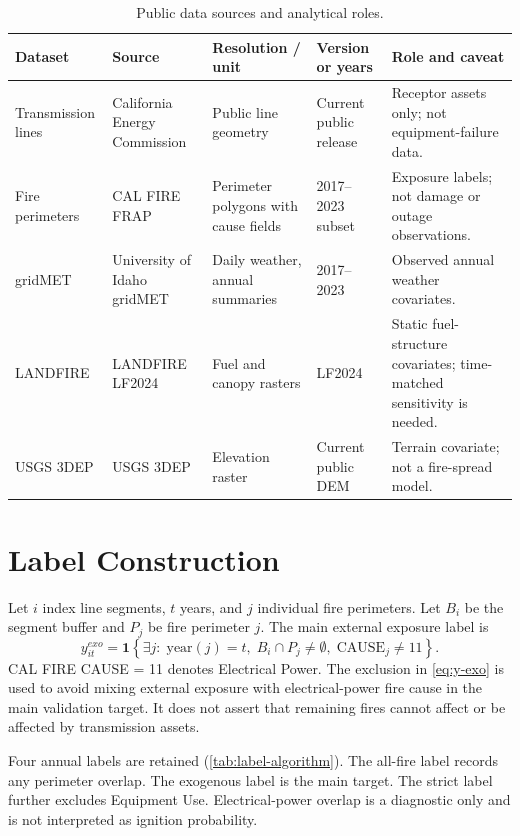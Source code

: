 \documentclass[11pt]{article}
\newcommand{\ind}{\mathbf{1}}
\begin{document}
\begin{table}[!htbp]
  \centering
  \footnotesize
  \setlength{\tabcolsep}{3pt}
  \caption{Public data sources and analytical roles.}
  \label{tab:data-sources}
  \begin{tabular}{L{0.16\textwidth} L{0.18\textwidth} L{0.16\textwidth} L{0.14\textwidth} L{0.25\textwidth}}
    \toprule
    Dataset & Source & Resolution / unit & Version or years & Role and caveat \\
    \midrule
    Transmission lines & California Energy Commission & Public line geometry & Current public release & Receptor assets only; not equipment-failure data. \\
    Fire perimeters & CAL FIRE FRAP & Perimeter polygons with cause fields & 2017--2023 subset & Exposure labels; not damage or outage observations. \\
    gridMET & University of Idaho gridMET & Daily weather, annual summaries & 2017--2023 & Observed annual weather covariates. \\
    LANDFIRE & LANDFIRE LF2024 & Fuel and canopy rasters & LF2024 & Static fuel-structure covariates; time-matched sensitivity is needed. \\
    USGS 3DEP & USGS 3DEP & Elevation raster & Current public DEM & Terrain covariate; not a fire-spread model. \\
    \bottomrule
  \end{tabular}
\end{table}

\section{Label Construction}

Let $i$ index line segments, $t$ years, and $j$ individual fire perimeters.
Let $B_i$ be the segment buffer and $P_j$ be fire perimeter $j$. The main
external exposure label is
\begin{equation}
  y^{exo}_{it}
  =
  \ind\left\{
  \exists j:\; \mathrm{year}(j)=t,\;
  B_i \cap P_j \neq \emptyset,\;
  \mathrm{CAUSE}_j \neq 11
  \right\}.
  \label{eq:y-exo}
\end{equation}
CAL FIRE CAUSE = 11 denotes Electrical Power. The exclusion in
\autoref{eq:y-exo} is used to avoid mixing external exposure with
electrical-power fire cause in the main validation target. It does not assert
that remaining fires cannot affect or be affected by transmission assets.

Four annual labels are retained (\autoref{tab:label-algorithm}). The all-fire
label records any perimeter overlap. The exogenous label is the main target.
The strict label further excludes Equipment Use. Electrical-power overlap is a
diagnostic only and is not interpreted as ignition probability.
\end{document}
